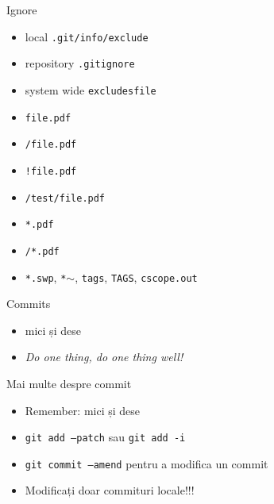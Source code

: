 \documentclass{beamer}
\begin{document}
\begin{frame}{Ignore}
  \begin{itemize}
    \item local \texttt{.git/info/exclude}
    \item repository \texttt{.gitignore}
    \item system wide \texttt{excludesfile}
  \end{itemize}
  \pause
  \begin{itemize}
    \item \texttt{file.pdf}
    \item \texttt{/file.pdf}
    \item \texttt{!file.pdf}
    \item \texttt{/test/file.pdf}
    \item \texttt{*.pdf}
    \item \texttt{/*.pdf}
    \item \texttt{*.swp}, \texttt{*$\sim$}, \texttt{tags}, \texttt{TAGS},
      \texttt{cscope.out}
  \end{itemize}
\end{frame}

\begin{frame}{Commits}
  \begin{itemize}
    \item mici și dese
    \item \textit{Do one thing, do one thing well!}
  \end{itemize}
  \begin{center}
  \end{center}
\end{frame}

\begin{frame}{Mai multe despre commit}
  \begin{itemize}
    \item Remember: mici și dese
    \item \texttt{git add --patch} sau \texttt{git add -i}
    \item \texttt{git commit --amend} pentru a modifica un commit
    \item Modificați doar commituri locale!!!
  \end{itemize}
\end{frame}

\end{document}

